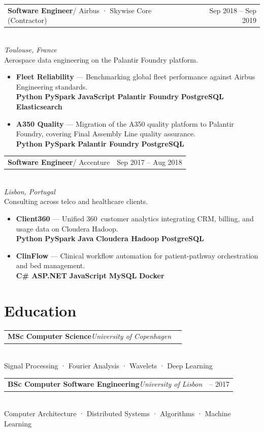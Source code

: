 \documentclass[10pt,a4paper]{article}
\makeatletter
\newcommand{\tech}[1]{%
  {\setlength{\fboxsep}{2.2pt}%
   \colorbox{tagbg}{\textcolor{brand}{\fontsize{6.5}{8}\selectfont\bfseries\sffamily #1}}}%
  \hspace{1pt}%
}
\newcommand{\datebadge}[1]{%
  {\setlength{\fboxsep}{2.5pt}%
   \colorbox{tagbg}{\textcolor{light}{\fontsize{7.5}{9}\selectfont\sffamily #1}}}%
}
\newcommand{\cventry}[4]{%
  \noindent
  \begin{tabularx}{\linewidth}{@{}X r@{}}
    \textcolor{brand}{\textbf{#1}}\enspace\textcolor{light}{\small#2} &
    \datebadge{#3}
  \end{tabularx}\\[-2pt]
  {\small\itshape\color{light} #4}\\[3pt]
}
\newcommand{\cvedu}[4]{%
  \noindent
  \begin{tabularx}{\linewidth}{@{}X r@{}}
    \textbf{#1}\enspace\textcolor{light}{\small\itshape #2} &
    \datebadge{#3}
  \end{tabularx}\\[-2pt]
  {\small\color{light} #4}\\[5pt]
}
\makeatother
\begin{document}
\vspace{5pt}

\cventry{Software Engineer}{/ Airbus · Skywise Core (Contractor)}{Sep 2018 – Sep 2019}{Toulouse, France}
Aerospace data engineering on the Palantir Foundry platform.
\begin{itemize}
  \item \textbf{Fleet Reliability} — Benchmarking global fleet performance against
        Airbus Engineering standards.\\[3pt]
        \tech{Python}\tech{PySpark}\tech{JavaScript}\tech{Palantir Foundry}%
        \tech{PostgreSQL}\tech{Elasticsearch}
  \item \textbf{A350 Quality} — Migration of the A350 quality platform to Palantir
        Foundry, covering Final Assembly Line quality assurance.\\[3pt]
        \tech{Python}\tech{PySpark}\tech{Palantir Foundry}\tech{PostgreSQL}
\end{itemize}

\vspace{5pt}

\cventry{Software Engineer}{/ Accenture}{Sep 2017 – Aug 2018}{Lisbon, Portugal}
Consulting across telco and healthcare clients.
\begin{itemize}
  \item \textbf{Client360} — Unified 360\textdegree\ customer analytics integrating CRM,
        billing, and usage data on Cloudera Hadoop.\\[3pt]
        \tech{Python}\tech{PySpark}\tech{Java}\tech{Cloudera Hadoop}\tech{PostgreSQL}
  \item \textbf{ClinFlow} — Clinical workflow automation for patient-pathway orchestration
        and bed management.\\[3pt]
        \tech{C\# ASP.NET}\tech{JavaScript}\tech{MySQL}\tech{Docker}
\end{itemize}

\section{Education}

\cvedu{MSc Computer Science}{University of Copenhagen}{2021}%
{Signal Processing · Fourier Analysis · Wavelets · Deep Learning}

\cvedu{BSc Computer Software Engineering}{University of Lisbon}{2015 – 2017}%
{Computer Architecture · Distributed Systems · Algorithms · Machine Learning}
\end{document}
